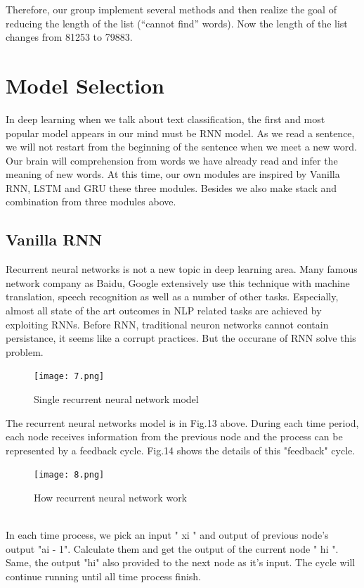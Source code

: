 \documentclass{article}
\begin{document}
\noindent Therefore, our group implement several methods and then realize  the goal of reducing the length of the list (“cannot find” words). Now the length of the list changes from 81253 to 79883.

\section{ Model Selection}
\noindent In deep learning when we talk about text classification,
the first and most popular model appears in our mind must be RNN model. As we read a sentence, we will not restart from the beginning of the sentence when we meet a new word. Our brain will comprehension from words we have already read and infer the meaning of new words. At this time, our own modules are inspired by Vanilla RNN, LSTM and GRU these three modules. Besides we also make stack and combination from three modules above.
\subsection{Vanilla RNN}
\noindent Recurrent neural networks is not a new topic in deep learning area. Many famous network company as Baidu, Google extensively use this technique with machine translation, speech recognition as well as a number of other tasks. Especially, almost all state of the art outcomes in NLP related tasks are achieved by exploiting RNNs. Before RNN, traditional neuron networks cannot contain persistance, it seems like a corrupt practices. But the occurane of RNN solve this problem.
\begin{figure}[H]
	\centering
	\texttt{[image: 7.png]}
	\caption{Single recurrent neural network model}
\end{figure}
\noindent The recurrent neural networks model is in Fig.13 above. During each time period, each node receives information from the previous node and the process can be represented by a feedback cycle. Fig.14 shows the details of this "feedback" cycle.
\begin{figure}[h]
	\centering
	\texttt{[image: 8.png]}
	\caption{How recurrent neural network work}
\end{figure}\\
\noindent In each time process, we pick an input " xi " and output of previous node's output "ai - 1". Calculate them and get the output of the current node " hi ". Same, the output "hi" also provided to the next node as it's input. The cycle will continue running until all time process finish.\\
\end{document}
